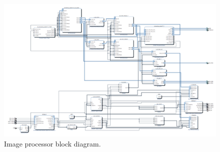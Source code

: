\begin{appendices}
\begin{figure}
  \centering
  \includegraphics[width=1\textwidth]{./img/zybo_receiver.png}
  \caption{Image processor block diagram.}
  \label{fig:zybo_receiver}
\end{figure}

\end{appendices}